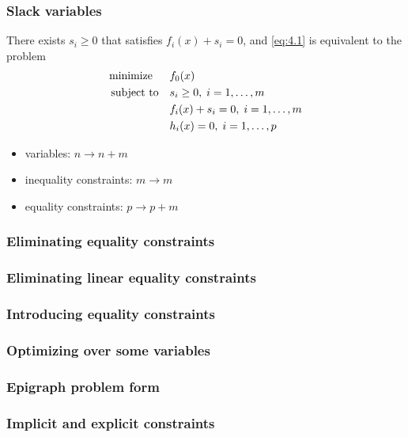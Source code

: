 \subsubsection{Slack variables}
There exists $s_i\ge 0$ that satisfies $f_i(x)+s_i=0$, and \eqref{eq:4.1} is equivalent to the problem
\begin{align}
  \text{minimize\;\;}\quad& f_0(x)\nonumber\\
  \text{subject to}  \quad& s_i\ge 0,\;i=1,\dots,m\nonumber\\
                          & f_i(x)+s_i=0,\;i=1,\dots,m\label{eq:4.7}\\
                          & h_i(x)=0,\;i=1,\dots,p\nonumber
\end{align}
\begin{itemize}
  \item variables: $n\rightarrow n+m$
  \item inequality constraints: $m\rightarrow m$
  \item equality constraints: $p\rightarrow p+m$
\end{itemize}

\subsubsection{Eliminating equality constraints}
\subsubsection{Eliminating linear equality constraints}
\subsubsection{Introducing equality constraints}
\subsubsection{Optimizing over some variables}
\begin{example}
\end{example}
\subsubsection{Epigraph problem form}
\subsubsection{Implicit and explicit constraints}

